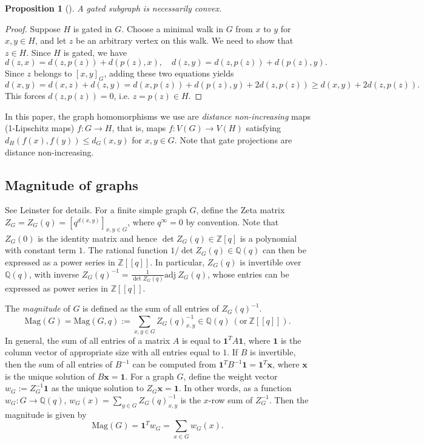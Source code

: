 \documentclass{amsart}
\numberwithin{equation}{section}
\newtheorem{prop}[thm]{Proposition}
\theoremstyle{plain}
\theoremstyle{remark}
\theoremstyle{definition}
\numberwithin{equation}{section}
\newcommand{\Q}{\mathbb{Q}}
\newcommand{\Z}{\mathbb{Z}}
\newcommand{\Mag}{\mathrm{Mag}}
\begin{document}
\begin{prop}[{\cite[Proposition A.1]{Aguiar2017}}]\label{gatedisconvex}
    A gated subgraph is necessarily convex.
\end{prop}

\begin{proof}
    Suppose $H$ is gated in $G$. Choose a minimal walk in $G$ from $x$ to $y$ for $x,y\in H$, and let $z$ be an arbitrary vertex on this walk. We need to show that $z\in H$. Since $H$ is gated, we have
    \[
    d(z,x)=d(z,p(z))+d(p(z),x),\quad d(z,y)=d(z,p(z))+d(p(z),y).
    \]
    Since $z$ belongs to $[x,y]_G$, adding these two equations yields
    \[
    d(x,y)=d(x,z)+d(z,y)=d(x,p(z))+d(p(z),y)+2d(z,p(z))\geq d(x,y)+2d(z,p(z)).
    \]
    This forces $d(z,p(z))=0$, i.e. $z=p(z)\in H$.
\end{proof}




In this paper, the graph homomorphisms we use are \emph{distance non-increasing} maps (1-Lipschitz maps) $f:G\to H$, that is, maps $f\colon V(G)\to V(H)$ satisfying $d_H(f(x),f(y))\leq d_G(x,y)$ for $x,y\in G$. Note that gate projections are distance non-increasing.




\subsection{Magnitude of graphs}\label{mag}
See Leinster \cite{Leinster2019} for details. 
For a finite simple graph $G$, define the Zeta matrix $Z_G=Z_G(q)=[q^{d(x,y)}]_{x,y\in G}$, where $q^{\infty}=0$ by convention. 
Note that $Z_G(0)$ is the identity matrix and hence $\det Z_G(q)\in\Z[q]$ is a polynomial with constant term $1$. 
The rational function $1/\det Z_G(q)\in\Q(q)$ can then be expressed as a power series in $\Z[\![q]\!]$. 
In particular, $Z_G(q)$ is invertible over $\Q(q)$, with inverse $Z_G(q)^{-1}=\frac{1}{\det Z_G(q)}\mathrm{adj}~Z_G(q)$, whose entries can be expressed as power series in $\Z[\![q]\!]$.


The \emph{magnitude} of $G$ is defined as the sum of all entries of $Z_G(q)^{-1}$.
\[
\Mag(G)=\Mag(G,q):=\sum_{x,y\in G}Z_G(q)^{-1}_{x,y}\in \Q(q) ~(\mathrm{or}~\Z[\![q]\!]).
\] 
In general, the sum of all entries of a matrix $A$ is equal to $\mathbf{1}^TA\mathbf{1}$, where $\mathbf{1}$ is the column vector of appropriate size with all entries equal to $1$. 
If $B$ is invertible, then the sum of all entries of $B^{-1}$ can be computed from $\mathbf{1}^TB^{-1}\mathbf{1}=\mathbf{1}^T\mathbf{x}$, where $\mathbf{x}$ is the unique solution of $B\mathbf{x}=\mathbf{1}$. For a graph $G$, define the weight vector $w_G:=Z_G^{-1}\mathbf{1}$ as the unique solution to $Z_G\mathbf{x}=\mathbf{1}$. In other words, as a function $w_G:G\to \Q(q)$, $w_G(x)=\sum_{y\in G}Z_G(q)^{-1}_{x,y}$ is the $x$-row sum of $Z_G^{-1}$. 
Then the magnitude is given by
\[
\Mag(G)=\mathbf{1}^Tw_G=\sum_{x\in G}w_G(x).
\]
\end{document}
